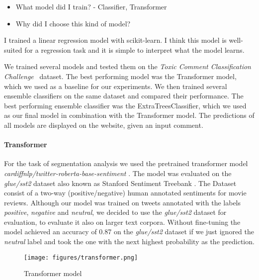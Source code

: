 \begin{itemize}
    \item What model did I train? - Classifier, Transformer
    \item Why did I choose this kind of model?
\end{itemize}

\begin{tcolorbox}[colback=green!5!white,colframe=green!75!black,title=Example]
  I trained a linear regression model with scikit-learn.
  I think this model is well-suited for a regression task and it is simple to interpret what the model learns.
\end{tcolorbox}


We trained several models and tested them on the \textit{Toxic Comment Classification Challenge}~\cite{jigsaw-toxic-comment-classification-challenge} dataset.
The best performing model was the Transformer model, which we used as a baseline for our experiments.
We then trained several ensemble classifiers on the same dataset and compared their performance.
The best performing ensemble classifier was the ExtraTreesClassifier, which we used as our final model in combination with the Transformer model.
The predictions of all models are displayed on the website, given an input comment.


\paragraph{Transformer}
For the task of segmentation analysis we used the pretrained transformer model \textit{cardiffnlp/twitter-roberta-base-sentiment} \cite{barbieri2020tweeteval}.
The model was evaluated on the \textit{glue/sst2} dataset also known as Stanford Sentiment Treebank \cite{socher2013recursive}.
 The Dataset consist of a two-way (positive/negative) human annotated sentiments for movie reviews. Although our model was trained
 on tweets annotated with the labels \textit{positive}, \textit{negative} and \textit{neutral}, we decided to use the \textit{glue/sst2} dataset for evaluation,
 to evaluate it also on larger text corpora. Without fine-tuning the model achieved an accuracy of 0.87 on the \textit{glue/sst2} dataset if we just
 ignored the \textit{neutral} label and took the one with the next highest probability as the prediction.

\begin{figure}[h]
\centering
\texttt{[image: figures/transformer.png]}
\caption{Transformer model}
\label{fig:transformer}
\end{figure}


